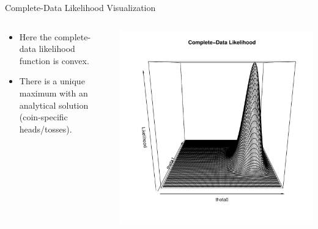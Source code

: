 \documentclass[dvipdfmx,bigger,aspectratio=169]{beamer}
\begin{document}
\begin{frame}[label={sec:org01c78bd}]{Complete-Data Likelihood Visualization}
\begin{columns}
\begin{column}{0.50\columnwidth}
\begin{itemize}
\item Here the complete-data likelihood function is convex.
\item There is a unique maximum with an analytical solution (coin-specific heads/tosses).
\end{itemize}
\end{column}

\begin{column}{0.50\columnwidth}
\scriptsize
\begin{center}
\includegraphics[page=1,keepaspectratio,width=\textwidth,height=\textheight]{./source/likelihood.pdf}
\end{center}
\normalsize
\end{column}
\end{columns}
\end{frame}
\end{document}

